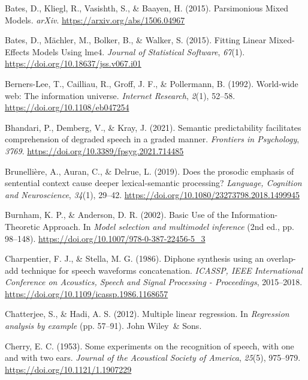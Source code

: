 \documentclass[a4paper, nobind]{templates/ociamthesis}
\newlength{\cslhangindent}
\newenvironment{CSLReferences}[2] %
 {%
  \setlength{\parindent}{0pt}
  \ifodd #1
  \let\oldpar\par
  \def\par{\hangindent=\cslhangindent\oldpar}
  \fi
  \setlength{\parskip}{1mm}
  \setlength{\baselineskip}{6mm}
 }%
 {}
\begin{document}
\begin{CSLReferences}{1}{0}
\leavevmode{}%
Bates, D., Kliegl, R., Vasishth, S., \& Baayen, H. (2015). {Parsimonious Mixed Models}. \emph{arXiv}. \url{https://arxiv.org/abs/1506.04967}

\leavevmode{}%
Bates, D., Mächler, M., Bolker, B., \& Walker, S. (2015). Fitting Linear Mixed-Effects Models Using lme4. \emph{Journal of Statistical Software}, \emph{67}(1). \url{https://doi.org/10.18637/jss.v067.i01}

\leavevmode{}%
Berners-Lee, T., Cailliau, R., Groff, J. F., \& Pollermann, B. (1992). {World-wide web: The information universe}. \emph{Internet Research}, \emph{2}(1), 52--58. \url{https://doi.org/10.1108/eb047254}

\leavevmode{}%
Bhandari, P., Demberg, V., \& Kray, J. (2021). {Semantic predictability facilitates comprehension of degraded speech in a graded manner}. \emph{Frontiers in Psychology}, \emph{3769}. \url{https://doi.org/10.3389/fpsyg.2021.714485}

\leavevmode{}%
Brunellière, A., Auran, C., \& Delrue, L. (2019). {Does the prosodic emphasis of sentential context cause deeper lexical-semantic processing?} \emph{Language, Cognition and Neuroscience}, \emph{34}(1), 29--42. \url{https://doi.org/10.1080/23273798.2018.1499945}

\leavevmode{}%
Burnham, K. P., \& Anderson, D. R. (2002). {Basic Use of the Information-Theoretic Approach}. In \emph{Model selection and multimodel inference} (2nd ed., pp. 98--148). \url{https://doi.org/10.1007/978-0-387-22456-5_3}

\leavevmode{}%
Charpentier, F. J., \& Stella, M. G. (1986). {Diphone synthesis using an overlap-add technique for speech waveforms concatenation.} \emph{ICASSP, IEEE International Conference on Acoustics, Speech and Signal Processing - Proceedings}, 2015--2018. \url{https://doi.org/10.1109/icassp.1986.1168657}

\leavevmode{}%
Chatterjee, S., \& Hadi, A. S. (2012). Multiple linear regression. In \emph{Regression analysis by example} (pp. 57--91). John Wiley~\& Sons.

\leavevmode{}%
Cherry, E. C. (1953). {Some experiments on the recognition of speech, with one and with two ears}. \emph{Journal of the Acoustical Society of America}, \emph{25}(5), 975--979. \url{https://doi.org/10.1121/1.1907229}


\end{CSLReferences}
\end{document}

